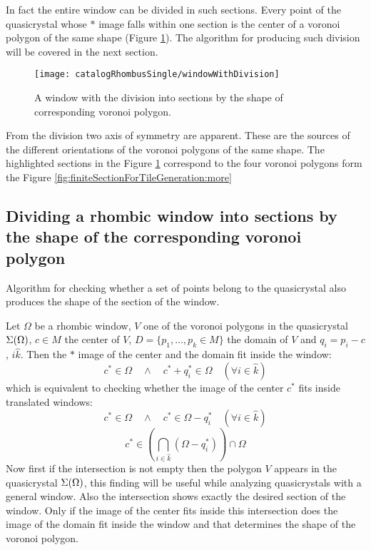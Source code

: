 \documentclass[text.tex]{subfiles}
\begin{document}
In fact the entire window can be divided in such sections. Every point of the quasicrystal whose $\ast$ image falls within one section is the center of a voronoi polygon of the same shape (Figure \ref{fig:windowWithDivision}). The algorithm for producing such division will be covered in the next section.  

\begin{figure}[h]
\centering
\texttt{[image: catalogRhombusSingle/windowWithDivision]}
\caption{A window with the division into sections by the shape of corresponding voronoi polygon.}
\label{fig:windowWithDivision}
\end{figure}

From the division two axis of symmetry are apparent. These are the sources of the different orientations of the voronoi polygons of the same shape. The highlighted sections in the Figure \ref{fig:windowWithDivision} correspond to the four voronoi polygons form the Figure \ref{fig:finiteSectionForTileGeneration:more}

\subsection{Dividing a rhombic window into sections by the shape of the corresponding voronoi polygon}
Algorithm for checking whether a set of points belong to the quasicrystal also produces the shape of the section of the window. 

Let $\Omega$ be a rhombic window, $V$ one of the voronoi polygons in the quasicrystal $\Sigma(\Omega)$, $c\in M$ the center of $V$, $D = \{p_1,\dots,p_k\in M\}$ the domain of $V$ and $q_i = p_i - c$, $i\hat{k}$.
Then the $\ast$ image of the center and the domain fit inside the window:
$$c^\ast\in\Omega \quad\wedge\quad c^\ast + q_i^\ast\in\Omega \quad(\forall i\in\hat{k})$$
which is equivalent to checking whether the image of the center $c^\ast$ fits inside translated windows:
$$c^\ast\in\Omega \quad\wedge\quad c^\ast\in\Omega-q_i^\ast \quad(\forall i\in\hat{k})$$
$$c^\ast\in\left(\bigcap\limits_{i\in\hat{k}}(\Omega-q_i^\ast)\right)\cap\Omega$$
Now first if the intersection is not empty then the polygon $V$ appears in the quasicrystal $\Sigma(\Omega)$, this finding will be useful while analyzing quasicrystals with a general window. Also the intersection shows exactly the desired section of the window. Only if the image of the center fits inside this intersection does the image of the domain fit inside the window and that determines the shape of the voronoi polygon. 
\end{document}
